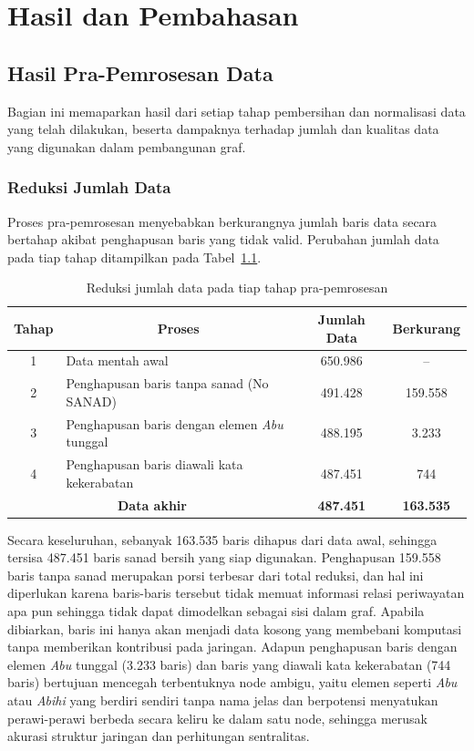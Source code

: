 \chapter{Hasil dan Pembahasan}

\section{Hasil Pra-Pemrosesan Data}
\label{sec:hasil-pra-pemrosesan}
Bagian ini memaparkan hasil dari setiap tahap pembersihan dan normalisasi data yang telah dilakukan, beserta dampaknya terhadap jumlah dan kualitas data yang digunakan dalam pembangunan graf.

\subsection{Reduksi Jumlah Data}
Proses pra-pemrosesan menyebabkan berkurangnya jumlah baris data secara bertahap akibat penghapusan baris yang tidak valid. Perubahan jumlah data pada tiap tahap ditampilkan pada Tabel~\ref{tab:reduksi-data}.

\begin{table}[H]
\centering
\caption{Reduksi jumlah data pada tiap tahap pra-pemrosesan}
\label{tab:reduksi-data}
\renewcommand{\arraystretch}{1.3}
\begin{tabular}{|c|p{6.5cm}|c|c|}
\hline
\multicolumn{1}{|c|}{\textbf{Tahap}} & \multicolumn{1}{c|}{\textbf{Proses}} & \multicolumn{1}{c|}{\textbf{Jumlah Data}} & \multicolumn{1}{c|}{\textbf{Berkurang}} \\
\hline
1 & Data mentah awal & 650.986 & -- \\
\hline
2 & Penghapusan baris tanpa sanad (No SANAD) & 491.428 & 159.558 \\
\hline
3 & Penghapusan baris dengan elemen \textit{Abu} tunggal & 488.195 & 3.233 \\
\hline
4 & Penghapusan baris diawali kata kekerabatan & 487.451 & 744 \\
\hline
\multicolumn{2}{|c|}{\textbf{Data akhir}} & \textbf{487.451} & \textbf{163.535} \\
\hline
\end{tabular}
\end{table}

Secara keseluruhan, sebanyak 163.535 baris dihapus dari data awal, sehingga tersisa 487.451 baris sanad bersih yang siap digunakan. Penghapusan 159.558 baris tanpa sanad merupakan porsi terbesar dari total reduksi, dan hal ini diperlukan karena baris-baris tersebut tidak memuat informasi relasi periwayatan apa pun sehingga tidak dapat dimodelkan sebagai sisi dalam graf. Apabila dibiarkan, baris ini hanya akan menjadi data kosong yang membebani komputasi tanpa memberikan kontribusi pada jaringan. Adapun penghapusan baris dengan elemen \textit{Abu} tunggal (3.233 baris) dan baris yang diawali kata kekerabatan (744 baris) bertujuan mencegah terbentuknya node ambigu, yaitu elemen seperti \textit{Abu} atau \textit{Abihi} yang berdiri sendiri tanpa nama jelas dan berpotensi menyatukan perawi-perawi berbeda secara keliru ke dalam satu node, sehingga merusak akurasi struktur jaringan dan perhitungan sentralitas.

